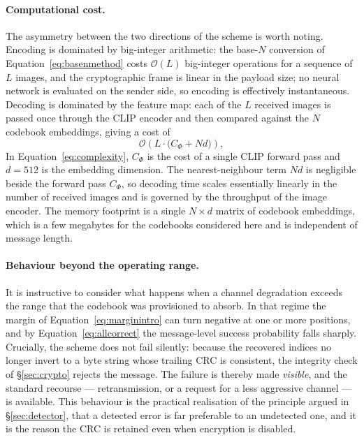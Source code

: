 \documentclass[10pt,a4paper]{article}
\theoremstyle{definition}
\begin{document}
\paragraph{Computational cost.}
The asymmetry between the two directions of the scheme is worth noting. Encoding is
dominated by big-integer arithmetic: the base-$N$ conversion of Equation~\eqref{eq:basenmethod}
costs $\mathcal{O}(L)$ big-integer operations for a sequence of $L$ images, and the
cryptographic frame is linear in the payload size; no neural network is evaluated on
the sender side, so encoding is effectively instantaneous. Decoding is dominated by
the feature map: each of the $L$ received images is passed once through the CLIP
encoder and then compared against the $N$ codebook embeddings, giving a cost of
\begin{equation}
  \mathcal{O}\!\left(L\cdot\bigl(C_\Phi + N d\bigr)\right),
  \label{eq:complexity}
\end{equation}
In Equation~\eqref{eq:complexity}, $C_\Phi$ is the cost of a single CLIP forward pass and
$d=512$ is the
embedding dimension. The nearest-neighbour term $Nd$ is negligible beside the
forward pass $C_\Phi$, so decoding time scales essentially linearly in the number
of received images and is governed by the throughput of the image encoder. The
memory footprint is a single $N\times d$ matrix of codebook embeddings, which is a
few megabytes for the codebooks considered here and is independent of message
length.

\paragraph{Behaviour beyond the operating range.}
It is instructive to consider what happens when a channel degradation exceeds the
range that the codebook was provisioned to absorb. In that regime the margin of
Equation~\eqref{eq:marginintro} can turn negative at one or more positions, and by
Equation~\eqref{eq:allcorrect} the message-level success probability falls sharply. Crucially,
the scheme does not fail silently: because the recovered indices no longer invert to
a byte string whose trailing CRC is consistent, the integrity check of
\S\ref{sec:crypto} rejects the message. The failure is thereby made \emph{visible},
and the standard recourse --- retransmission, or a request for a less aggressive
channel --- is available. This behaviour is the practical realisation of the
principle argued in \S\ref{sec:detector}, that a detected error is far preferable to
an undetected one, and it is the reason the CRC is retained even when encryption is
disabled.
\end{document}
